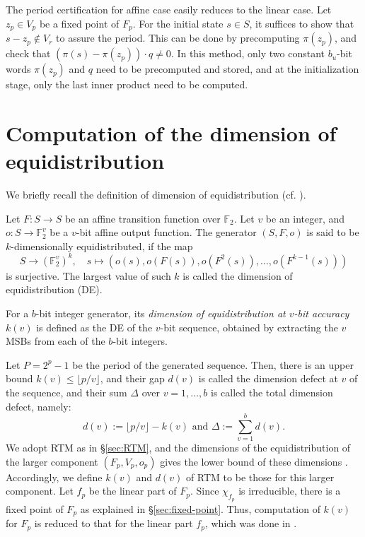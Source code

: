 \documentclass{svmult}
\begin{document}
The period certification for affine case easily reduces to the linear case.
Let $z_p \in V_p$ be a fixed point of $F_p$. For the initial state $s \in S$,
it suffices to show that $s-z_p \notin V_r$ to assure the period. This
can be done by precomputing $\pi(z_p)$, and check that
$(\pi(s)-\pi(z_p))\cdot q \neq 0$. In this method, only two
constant $b_u$-bit words $\pi(z_p)$ and $q$ need to be precomputed
and stored, and at the initialization stage, only the last inner product
need to be computed.

\section{Computation of the dimension of equidistribution}
\label{sec:DE}
We briefly recall the definition of dimension of
equidistribution (cf. \cite{CLT}\cite{COMBTAUS}\cite{SFMT}).
\begin{definition}\label{def:DE}
Let $F:S \to S$ be an affine transition function over $\mathbb{F}_2$.
Let $v$ be an integer, and $o:S \to {\mathbb F}_2^v$ be a $v$-bit
affine output function. The generator $(S, F, o)$ is said to be
$k$-dimensionally equidistributed, if the map
$$
 S \to ({\mathbb F}_2^v)^k, \quad s \mapsto (o(s),o(F(s)), o(F^2(s)),\ldots,o(F^{k-1}(s)))
$$
is surjective.
The largest value of such $k$ is called the dimension
of equidistribution (DE).
\end{definition}
For a $b$-bit integer generator, its {\em dimension of
equidistribution at $v$-bit accuracy} $k(v)$
is defined as the DE of the $v$-bit sequence, obtained by extracting
the $v$ MSBs from each of the $b$-bit integers.

Let $P=2^p-1$ be the period of the generated sequence.
Then, there is an upper bound
$k(v) \leq \lfloor p / v \rfloor$,
and their gap $d(v)$ is
called the dimension defect at $v$ of the sequence,
and their sum $\Delta$ over $v=1,\ldots,b$ is called
the total dimension defect, namely:
\begin{equation}\label{eq:total-dim-difect}
d(v):=\lfloor p / v \rfloor -k(v)
\mbox{ and } \Delta:=\sum_{v=1}^b d(v).
\end{equation}
We adopt RTM as in \S\ref{sec:RTM}, and
the dimensions of the equidistribution of
the larger component $(F_p, V_p, o_p)$ gives the
lower bound of these dimensions \cite{LEcuyer-combdif}
\cite{SFMT}. Accordingly, we define $k(v)$ and $d(v)$ of
RTM to be those for this larger component. Let $f_p$
be the linear part of $F_p$.
Since $\chi_{f_p}$ is irreducible, there is a fixed point
of $F_p$ as explained in \S\ref{sec:fixed-point}. Thus,
computation of $k(v)$ for $F_p$ is reduced to
that for the linear part $f_p$, which was done in \cite{SFMT}.
\end{document}
